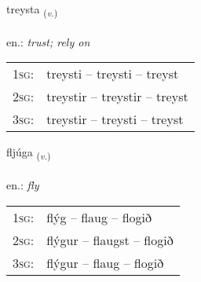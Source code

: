 \documentclass[frontgrid, backgrid]{flacards}\usepackage[]{graphicx}\usepackage[]{xcolor}
\begin{document}
\renewcommand{\flhead}{\vskip5pt \fboxsep=0pt {\small\bfseries\footnotesize Sagnorð | Verb}}
\renewcommand{\fcfoot}{\vskip5pt \fboxsep=0pt \hspace{2pt}{\small\bfseries\footnotesize 1K}}

\renewcommand{\blhead}{\vskip5pt {\small\bfseries\footnotesize Sagnorð | Verb }}
\renewcommand{\bcfoot}{\vskip5pt \hspace{2pt}{\small\bfseries\footnotesize 1K}}


{treysta \small{\textsubscript{(\textit{v.})}} \\[1ex] %
\textphonetic{[tʰreista]} \\
en.: \emph{trust; rely on} \\  [2ex]
\renewcommand*{\arraystretch}{0.8}
\begin{tabular}{p{1cm}l}
\textsc{1sg}: & treysti -- treysti -- treyst \\ 
\textsc{2sg}: & treystir -- treystir -- treyst \\ 
\textsc{3sg}: & treystir -- treysti -- treyst \\ 
\end{tabular}
}

\renewcommand{\flhead}{\vskip5pt \fboxsep=0pt {\small\bfseries\footnotesize Sagnorð | Verb}}
\renewcommand{\fcfoot}{\vskip5pt \fboxsep=0pt \hspace{2pt}{\small\bfseries\footnotesize 1K}}

\renewcommand{\blhead}{\vskip5pt {\small\bfseries\footnotesize Sagnorð | Verb }}
\renewcommand{\bcfoot}{\vskip5pt \hspace{2pt}{\small\bfseries\footnotesize 1K}}


{fljúga \small{\textsubscript{(\textit{v.})}} \\[1ex] %
\textphonetic{[fljuːɣa]} \\
en.: \emph{fly} \\  [2ex]
\renewcommand*{\arraystretch}{0.8}
\begin{tabular}{p{1cm}l}
\textsc{1sg}: & flýg -- flaug -- flogið \\ 
\textsc{2sg}: & flýgur -- flaugst -- flogið \\ 
\textsc{3sg}: & flýgur -- flaug -- flogið \\ 
\end{tabular}
}
\end{document}
